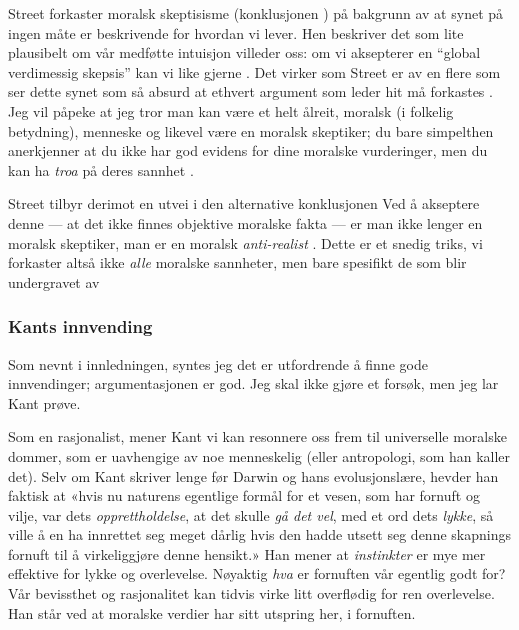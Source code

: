 \documentclass[a4paper,norsk]{article}
\begin{document}
Street forkaster moralsk skeptisisme (konklusjonen ) på bakgrunn
av at synet på ingen måte er beskrivende for hvordan vi lever.  Hen beskriver
det som lite plausibelt om vår medføtte intuisjon villeder oss: om vi
aksepterer en \enquote{global verdimessig skepsis} kan vi like gjerne
. Det virker som Street er av en flere som ser dette
synet som så absurd at ethvert argument som leder hit må forkastes
\autocite{sep-skepticism-moral}. Jeg vil påpeke at jeg tror man kan være et
helt ålreit, moralsk (i folkelig betydning), menneske og likevel være en
moralsk skeptiker; du bare simpelthen anerkjenner at du ikke har god evidens
for dine moralske vurderinger, men du kan ha \emph{troa} på deres sannhet
\autocite[for litt mer om dette se][]{sep-skepticism-moral}.

Street tilbyr derimot en utvei i den alternative konklusjonen 
Ved å akseptere denne --- at det ikke finnes objektive moralske fakta --- er
man ikke lenger en moralsk skeptiker, man er en moralsk \emph{anti-realist}
\autocite{sep-moral-anti-realism}. Dette er et snedig triks, vi forkaster altså
ikke \emph{alle} moralske sannheter, men bare spesifikt de som blir undergravet
av 

\subsubsection*{Kants innvending}

Som nevnt i innledningen, syntes jeg det er utfordrende å finne gode
innvendinger; argumentasjonen er god. Jeg skal ikke gjøre et forsøk, men jeg lar
Kant prøve.

Som en rasjonalist, mener Kant vi kan resonnere oss frem til universelle
moralske dommer, som er uavhengige av noe menneskelig (eller antropologi, som
han kaller det). Selv om Kant skriver lenge før Darwin og hans evolusjonslære,
hevder han faktisk at «hvis nu naturens egentlige formål for et vesen, som har
fornuft og vilje, var dets \emph{opprettholdelse}, at det skulle \emph{gå det
vel}, med et ord dets \emph{lykke}, så ville å en ha innrettet seg meget dårlig
hvis den hadde utsett seg denne skapnings fornuft til å virkeliggjøre denne
hensikt.» \autocite[4:395]{kant} Han mener at \emph{instinkter} er mye mer
effektive for lykke og overlevelse. Nøyaktig \emph{hva} er fornuften vår
egentlig godt for? Vår bevissthet og rasjonalitet kan tidvis virke litt
overflødig for ren overlevelse. Han står ved at moralske verdier har sitt
utspring her, i fornuften.
\end{document}
